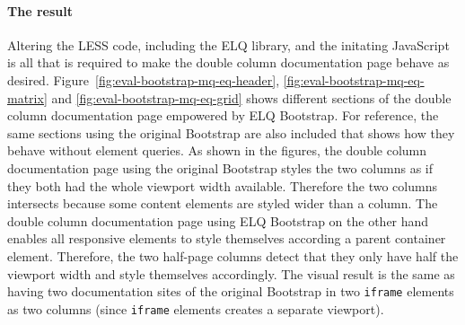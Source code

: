 \documentclass[a4paper,11pt]{kth-mag}
\newcommand{\code}[1]{\texttt{#1}}
\begin{document}
      \paragraph{The result}
      Altering the \gls{LESS} code, including the \gls{ELQ} library, and the initating \gls{JavaScript} is all that is required to make the double column documentation page behave as desired.
      Figure~\ref{fig:eval-bootstrap-mq-eq-header}, \ref{fig:eval-bootstrap-mq-eq-matrix} and \ref{fig:eval-bootstrap-mq-eq-grid} shows different sections of the double column documentation page empowered by \gls{ELQ} \gls{Bootstrap}.
      For reference, the same sections using the original \gls{Bootstrap} are also included that shows how they behave without element queries.
      As shown in the figures, the double column documentation page using the original \gls{Bootstrap} styles the two columns as if they both had the whole \gls{viewport} width available.
      Therefore the two columns intersects because some content \glspl{element} are styled wider than a column.
      The double column documentation page using \gls{ELQ} \gls{Bootstrap} on the other hand enables all \gls{responsive} \glspl{element} to style themselves according a parent container \gls{element}.
      Therefore, the two half-page columns detect that they only have half the \gls{viewport} width and style themselves accordingly.
      The visual result is the same as having two documentation sites of the original \gls{Bootstrap} in two \code{iframe} \glspl{element} as two columns (since \code{iframe} \glspl{element} creates a separate \gls{viewport}).
\end{document}

